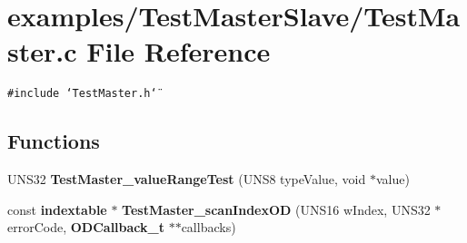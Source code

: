 \section{examples/Test\-Master\-Slave/Test\-Master.c File Reference}
\label{TestMasterSlave_2TestMaster_8c}
{\tt \#include \char`\"{}Test\-Master.h\char`\"{}}\par
\subsection*{Functions}
\begin{CompactItemize}
\item 
UNS32 {\bf Test\-Master\_\-value\-Range\-Test} (UNS8 type\-Value, void $\ast$value)
\item 
const {\bf indextable} $\ast$ {\bf Test\-Master\_\-scan\-Index\-OD} (UNS16 w\-Index, UNS32 $\ast$error\-Code, {\bf ODCallback\_\-t} $\ast$$\ast$callbacks)
\end{CompactItemize}
